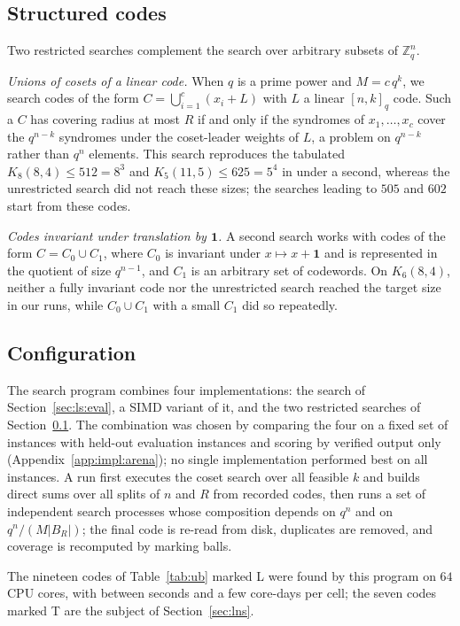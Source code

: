 \documentclass[11pt]{amsart}
\newcommand{\Kq}[3]{K_{#1}(#2,#3)}
\newcommand{\Zq}{\mathbb{Z}_q}
\begin{document}
\subsection{Structured codes}\label{sec:ls:structure}

Two restricted searches complement the search over arbitrary subsets of
$\Zq^n$.

\emph{Unions of cosets of a linear code.} When $q$ is a prime power and
$M=c\,q^k$, we search codes of the form $C=\bigcup_{i=1}^{c}(x_i+L)$ with
$L$ a linear $[n,k]_q$ code. Such a $C$ has covering radius at most $R$ if
and only if the syndromes of $x_1,\dots,x_c$ cover the $q^{n-k}$ syndromes
under the coset-leader weights of $L$, a problem on $q^{n-k}$ rather than
$q^n$ elements. This search reproduces the tabulated $\Kq{8}{8}{4}\le
512=8^3$ and $\Kq{5}{11}{5}\le 625=5^4$ in under a second, whereas the
unrestricted search did not reach these sizes; the searches leading to
$505$ and $602$ start from these codes.

\emph{Codes invariant under translation by $\mathbf{1}$.} A second search
works with codes of the form $C=C_0\cup C_1$, where $C_0$ is invariant
under $x\mapsto x+\mathbf{1}$ and is represented in the quotient of size
$q^{n-1}$, and $C_1$ is an arbitrary set of codewords. On $\Kq{6}{8}{4}$,
neither a fully invariant code nor the unrestricted search reached the
target size in our runs, while $C_0\cup C_1$ with a small $C_1$ did so
repeatedly.

\subsection{Configuration}\label{sec:ls:config}

The search program combines four implementations: the search of
Section~\ref{sec:ls:eval}, a SIMD variant of it, and the two restricted
searches of Section~\ref{sec:ls:structure}. The combination was chosen by
comparing the four on a fixed set of instances with held-out evaluation
instances and scoring by verified output only (Appendix~\ref{app:impl:arena});
no single implementation performed best on all instances. A run first
executes the coset search over all feasible $k$ and builds direct sums
over all splits of $n$ and $R$ from recorded codes, then runs a set of
independent search processes whose composition depends on $q^n$ and on
$q^n/(M|B_R|)$; the final code is re-read from disk, duplicates are
removed, and coverage is recomputed by marking balls.

The nineteen codes of Table~\ref{tab:ub} marked L were found by this
program on $64$ CPU cores, with between seconds and a few core-days per
cell; the seven codes marked T are the subject of
Section~\ref{sec:lns}.
\end{document}
